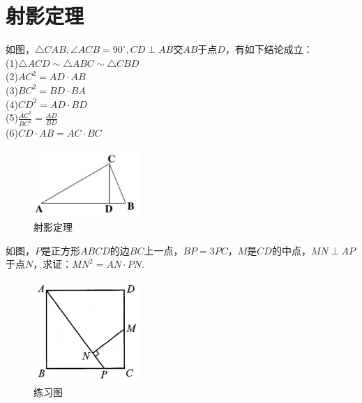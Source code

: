 \documentclass{ecnuthesis}
\begin{document}
\section{射影定理}
\begin{model}
    如图，$\triangle CAB,\angle ACB=90^\circ,CD\perp AB$交$AB$于点$D$，有如下结论成立：\\
    (1)$\triangle ACD \sim \triangle ABC \sim \triangle CBD $ \\
    (2)$AC^2 = AD·AB$ \\
    (3)$BC^2 = BD·BA$ \\
    (4)$CD^2 = AD·BD$ \\
    (5)$\frac{AC^2}{BC^2}=\frac{AD}{BD}$ \\
    (6)$CD·AB = AC·BC$
\end{model}
\begin{figure}[H]
\centering
\includegraphics[width=4cm]{picture/812.png}
\caption{射影定理}
\end{figure}
\begin{problem}
    如图，$P$是正方形$ABCD$的边$BC$上一点，$BP=3PC$，$M$是$CD$的中点，$MN\perp AP$于点$N$，求证：$MN^2=AN·PN.$
\end{problem}
\begin{figure}[H]
\centering
\includegraphics[width=4cm]{picture/813.png}
\caption{练习图}
\end{figure}
\clearpage
\end{document}

